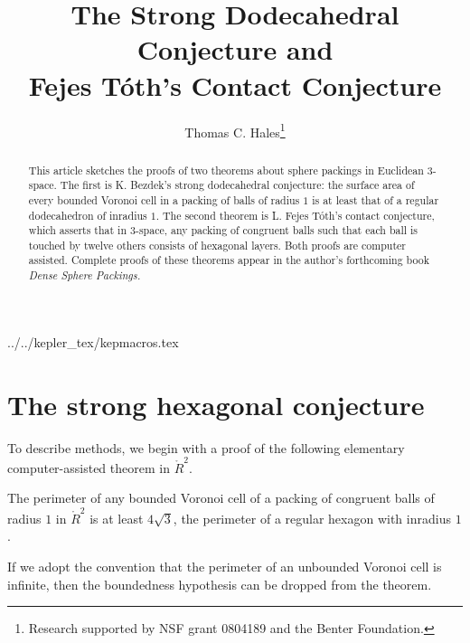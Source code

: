 \documentclass{llncs}
\begin{document}
\title{The Strong Dodecahedral Conjecture and\\ Fejes T\'oth's Contact Conjecture}
\author{Thomas C. Hales\thanks{{Research supported by 
NSF grant 0804189 and the Benter Foundation.}}}
\maketitle


\begin{abstract} This article sketches the proofs of two theorems
  about sphere packings in Euclidean $3$-space.  The first is
  K. Bezdek's strong dodecahedral conjecture: the surface area of
  every bounded Voronoi cell in a packing of balls of radius $1$ is at
  least that of a regular dodecahedron of inradius $1$.  The second
  theorem is L. Fejes T\'oth's contact conjecture, which asserts that
  in $3$-space, any packing of congruent balls such that each ball is
  touched by twelve others consists of hexagonal layers.  Both proofs
  are computer assisted.  Complete proofs of these theorems appear in
  the author's forthcoming book {\it Dense Sphere Packings.}
\end{abstract}

 {../../kepler_tex/kepmacros.tex}
%

\def\svninfo{{\tt
  filename: sdodec.tex\hfill\break
  PDF generated from LaTeX sources on \today; \hfill\break
  Repository Root: https://flyspeck.googlecode.com/svn \hfill\break
  SVN $LastChangedRevision$
  }
  }


\section{The strong hexagonal conjecture}

To describe methods, we begin with a proof of the following elementary
computer-assisted theorem in $\ring{R}^2$.

\begin{theorem} The perimeter of any bounded Voronoi cell of a packing
  of congruent balls of radius $1$ in $\ring{R}^2$ is at least
  $4\sqrt{3}$, the perimeter of a regular hexagon with inradius $1$.
\end{theorem}

If we adopt the convention that the perimeter of an unbounded Voronoi
cell is infinite, then the boundedness hypothesis can be dropped from
the theorem.
\end{document}
